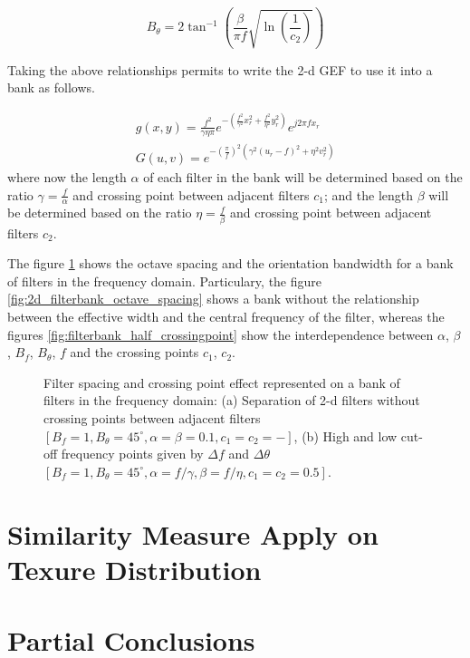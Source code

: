 \begin{equation}\label{eq:orientation_bandwidth}
    B_{\theta} = 2 \tan^{-1} \left( \frac{\beta}{\pi f} \sqrt{\ln \left(\frac{1}{c_2}\right)} \right)
\end{equation}

Taking the above relationships permits to write the 2-d GEF to use it into a bank as follows. 

\begin{equation}\label{eq:gabor_function_2d_spacefreq_bank}
    \begin{gathered}
         g(x,y) =  \frac{f^2}{\gamma \eta \pi} e ^{-\left(\frac{f^2}{\gamma^2} x_r^2 + \frac{f^2}{\eta^2} y_r^2\right)} e ^{j 2 \pi f x_r } \\
         G(u,v) =  e ^{-\left(\frac{\pi}{f}\right)^2\left( \gamma^2 (u_r-f)^2 + \eta^2 v_r^2\right)}
     \end{gathered}
\end{equation}
where now the length $\alpha$ of each filter in the bank will be determined based on the ratio $\gamma = \frac{f}{\alpha}$ and crossing point between adjacent filters $c_1$; and the length $\beta$ will be determined based on the ratio $\eta = \frac{f}{\beta}$ and crossing point between adjacent filters $c_2$.

The figure \ref{fig:2d_filterbank_spacing} shows the octave spacing and the orientation bandwidth for a bank of filters in the frequency domain. Particulary, the figure \ref{fig:2d_filterbank_octave_spacing} shows a bank without the relationship between the effective width and the central frequency of the filter, whereas the figures \ref{fig:filterbank_half_crossingpoint} show the interdependence between $\alpha$, $\beta$, $B_f$, $B_{\theta}$, $f$ and the crossing points $c_1$, $c_2$.

\begin{figure}
\centering
\caption{Filter spacing and crossing point effect represented on a bank of filters in the frequency domain: (a) Separation of 2-d filters without crossing points between adjacent filters $[B_f=1, B_{\theta} = 45^{\circ}, \alpha=\beta=0.1, c_1=c_2=-]$, (b) High and low cut-off frequency points given by $\Delta f$ and $\Delta \theta$ $[B_f=1, B_{\theta} = 45^{\circ}, \alpha=f/\gamma, \beta=f/\eta, c_1=c_2=0.5]$.}\label{fig:2d_filterbank_spacing}
\end{figure}

\section{Similarity Measure Apply on Texure Distribution}
\section{Partial Conclusions}